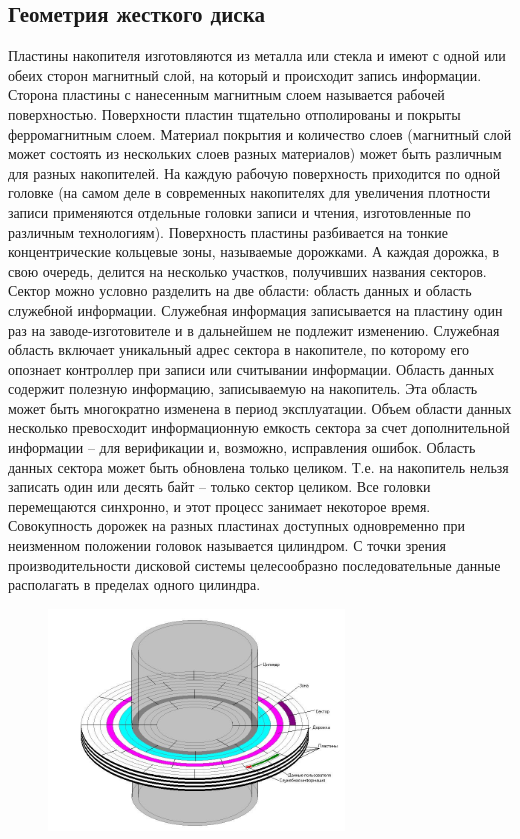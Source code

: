 \documentclass[bachelor, och, referat]{SCWorks}
\begin{document}
\subsection{Геометрия жесткого диска}

Пластины накопителя изготовляются из металла или стекла и имеют с одной или 
обеих сторон магнитный слой, на который и происходит запись информации. Сторона 
пластины с нанесенным магнитным слоем называется рабочей поверхностью. 
Поверхности пластин тщательно отполированы и покрыты ферромагнитным слоем. 
Материал покрытия и количество слоев (магнитный слой может состоять из 
нескольких слоев разных материалов) может быть различным для разных накопителей.
На каждую рабочую поверхность приходится по одной головке (на самом деле в 
современных накопителях для увеличения плотности записи применяются отдельные 
головки записи и чтения, изготовленные по различным технологиям). Поверхность 
пластины разбивается на тонкие концентрические кольцевые зоны, называемые 
дорожками. А каждая дорожка, в свою очередь, делится на несколько участков, 
получивших названия секторов. Сектор можно условно разделить на две области: 
область данных и область служебной информации. Служебная информация 
записывается на пластину один раз на заводе-изготовителе и в дальнейшем не 
подлежит изменению. Служебная область включает уникальный адрес сектора в 
накопителе, по которому его опознает контроллер при записи или считывании 
информации. Область данных содержит полезную информацию, записываемую на 
накопитель. Эта область может быть многократно изменена в период эксплуатации. 
Объем области данных несколько превосходит информационную емкость сектора за 
счет дополнительной информации – для верификации и, возможно, исправления 
ошибок. Область данных сектора может быть обновлена только целиком. Т.е. на 
накопитель нельзя записать один или десять байт – только сектор целиком. Все 
головки перемещаются синхронно, и этот процесс занимает некоторое время. 
Совокупность дорожек на разных пластинах доступных одновременно при неизменном 
положении головок называется цилиндром. С точки зрения производительности 
дисковой системы целесообразно последовательные данные располагать в пределах 
одного цилиндра.

\begin{figure}[H]
    \centering
    \includegraphics[width=0.7\textwidth]{geom_hdd.png}
    \caption{}
    \label{}
\end{figure}
\end{document}
